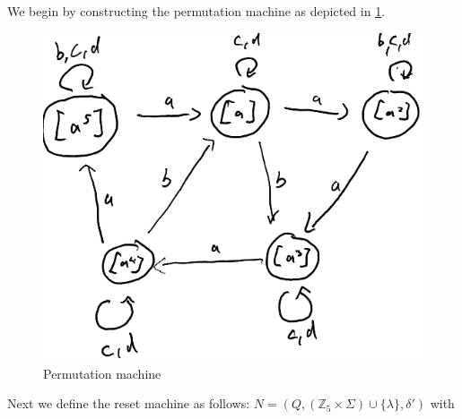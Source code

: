 \documentclass[a4paper,12pt,numbers=noenddot]{scrreport}
\begin{document}
\section{}
We begin by constructing the permutation machine as depicted in \ref{fig:permutation machine}.
\begin{figure}[h]
    \centering
    \includegraphics[width=0.5\linewidth]{Permutation_Machine.png}
    \caption{Permutation machine}
    \label{fig:permutation machine}
\end{figure}
Next we define the reset machine as follows: $N = (Q, (\mathbb{Z}_5 \times \Sigma) \cup \{\lambda\}, \delta')$ with \\
\end{document}
